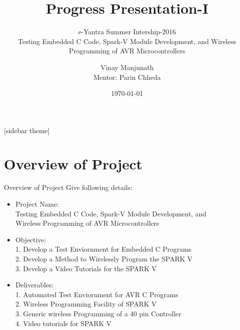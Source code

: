 \documentclass[10pt, a4paper]{beamer}
\begin{document}
	\title{Progress Presentation-I}
	\subtitle{e-Yantra Summer Intership-2016 \\ Testing Embedded C Code, Spark-V Module Development, and Wireless Programming of AVR Microcontrollers }
	\author{Vinay Manjunath \\
	Mentor: Parin Chheda}
	\date{\today}
	\frame{\titlepage}

[sidebar theme]
\section{Overview of Project}
\begin{frame}{Overview of Project}
	Give following details: \\
	\begin{itemize}
		\item Project Name:\\
	        \hspace{.1cm} Testing Embedded C Code, Spark-V Module Development, and \\
		\hspace{.1cm} Wireless Programming of AVR Microcontrollers \\
		\item Objective:\\
		\hspace{.1cm} 1. Develop a Test Enviornment for Embedded C Programs\\
		\hspace{.1cm} 2. Develop a Method to Wirelessly Program the SPARK V\\
		\hspace{.1cm} 3. Develop a Video Tutorials for the SPARK V \\
		\item Deliverables:\\
		\hspace{.1cm} 1. Automated Test Enviornment for AVR C Programs\\
		\hspace{.1cm} 2. Wireless Programming Facility of SPARK V\\
		\hspace{.1cm} 3. Generic wireless Programming of a 40 pin Controller \\
		\hspace{.1cm} 4. Video tutorials for SPARK V\\
	\end{itemize}
\end{frame}
\end{document}
